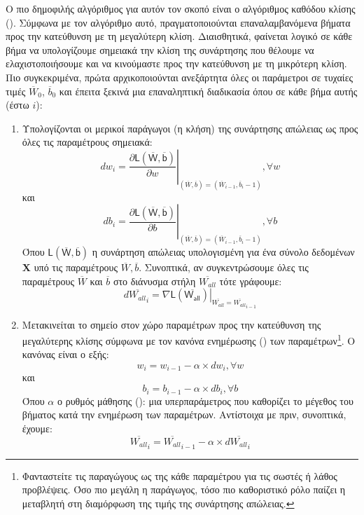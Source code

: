 Ο πιο δημοφιλής αλγόριθμος για αυτόν τον σκοπό είναι ο αλγόριθμος καθόδου κλίσης (). Σύμφωνα με τον αλγόριθμο αυτό, πραγματοποιούνται επαναλαμβανόμενα βήματα  προς την κατεύθυνση με τη μεγαλύτερη κλίση. Διαισθητικά, φαίνεται λογικό σε κάθε βήμα να υπολογίζουμε σημειακά την κλίση της συνάρτησης που θέλουμε να ελαχιστοποιήσουμε και να κινούμαστε προς την κατεύθυνση με τη μικρότερη κλίση. Πιο συγκεκριμένα, πρώτα αρχικοποιούνται ανεξάρτητα όλες οι παράμετροι σε τυχαίες τιμές $\overline{W}_0$, $\overline{b}_0$ και έπειτα ξεκινά μια επαναληπτική διαδικασία όπου σε κάθε βήμα αυτής (έστω $i$):
\begin{enumerate}
  \item Υπολογίζονται οι μερικοί παράγωγοι (η κλήση) της συνάρτησης απώλειας ως προς όλες τις παραμέτρους σημειακά:
    \begin{equation}
      dw_i = \left.\frac{\partial \mathsf{L(\overline{W},\overline{b})}}{\partial w}\right\rvert_{(\overline{W},\overline{b})=(\overline{W}_{i-1},\overline{b}_i-1)}, \forall{w}
    \end{equation}
    και
    \begin{equation}
    db_i = \left.\frac{\partial \mathsf{L(\overline{W},\overline{b})}}{\partial b}\right\rvert_{(\overline{W},\overline{b})=(\overline{W}_{i-1},\overline{b}_i-1)}, \forall{b}
    \end{equation}
    Όπου $\mathsf{L(\overline{W},\overline{b})}$ η συνάρτηση απώλειας υπολογισμένη για ένα σύνολο δεδομένων $\boldsymbol{X}$ υπό τις παραμέτρους $\overline{W},\overline{b}$.
    Συνοπτικά, αν συγκεντρώσουμε όλες τις παραμέτρους $\overline{W}$ και $\overline{b}$ στο διάνυσμα στήλη $\overline{W_{all}}$ τότε γράφουμε:
    \begin{equation}
      {d \overline{W_{all}}}_i = \left.\nabla{\mathsf{L(\overline{W_{all}})}}\right\rvert_{\overline{W_{all}}=\overline{W_{all}}_{i-1}}
    \end{equation}
  \item Μετακινείται το σημείο στον χώρο παραμέτρων προς την κατεύθυνση της μεγαλύτερης κλίσης σύμφωνα με τον κανόνα ενημέρωσης () των παραμέτρων\footnote{Φανταστείτε τις παραγώγους ως  της κάθε παραμέτρου για τις σωστές ή λάθος προβλέψεις. Όσο πιο μεγάλη η παράγωγος, τόσο πιο καθοριστικό ρόλο παίζει η μεταβλητή στη διαμόρφωση της τιμής της συνάρτησης απώλειας.}. Ο κανόνας είναι ο εξής:
  \begin{equation}
    w_i = w_{i-1} - \alpha \times dw_i, \forall{w} \end{equation}
    και
    \begin{equation} b_i = b_{i-1} - \alpha \times db_i, \forall{b}
    \end{equation}
    Όπου $\alpha$ ο ρυθμός μάθησης (): μια υπερπαράμετρος που καθορίζει το μέγεθος του βήματος κατά την ενημέρωση των παραμέτρων. Αντίστοιχα με πριν, συνοπτικά, έχουμε:
    \begin{equation}
      {\overline{W_{all}}}_i = {\overline{W_{all}}}_{i-1} - \alpha \times {d \overline{W_{all}}}_i
    \end{equation}
\end{enumerate} 
